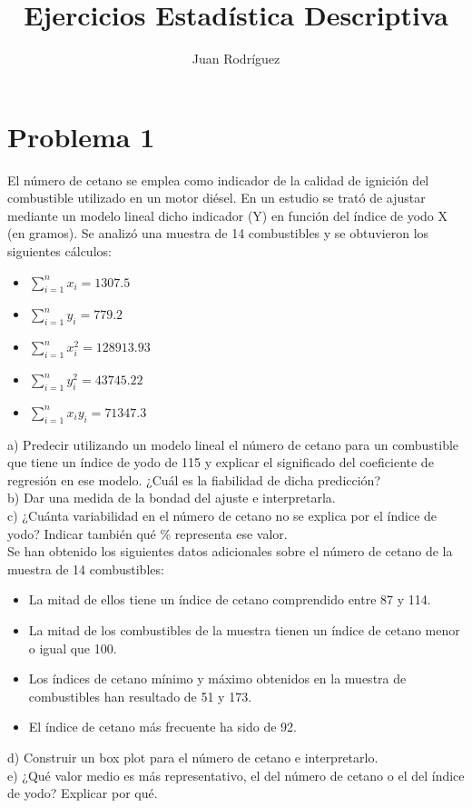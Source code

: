 \documentclass[fleqn]{article}
\title{Ejercicios Estadística Descriptiva}
\author{Juan Rodríguez}
\begin{document}
	\maketitle
	\section{Problema 1}
	El número de cetano se emplea como indicador de la calidad de ignición del combustible utilizado en un motor diésel. En un estudio se trató de ajustar mediante un modelo lineal dicho indicador (Y) en función del índice de yodo X (en gramos). Se analizó una muestra de 14 combustibles y se obtuvieron los siguientes cálculos:
	\begin{itemize}
		\item $\sum_{i=1}^n x_i = 1307.5$ 
		\item $\sum_{i=1}^n y_i = 779.2$ 
		\item $\sum_{i=1}^n x_i^2 = 128913.93$
		\item $\sum_{i=1}^n y_i^2 = 43745.22$
		\item $\sum_{i=1}^n x_i y_i = 71347.3$
	\end{itemize}
	a) Predecir utilizando un modelo lineal el número de cetano para un combustible que tiene un índice de yodo de 115 y explicar el significado del coeficiente de regresión en ese modelo. ¿Cuál es la fiabilidad de dicha predicción? \\
	b) Dar una medida de la bondad del ajuste e interpretarla. \\
	c) ¿Cuánta variabilidad en el número de cetano no se explica por el índice de yodo? Indicar también qué \% representa ese valor. \\
	
	Se han obtenido los siguientes datos adicionales sobre el número de cetano de la muestra de 14 combustibles:
	
	\begin{itemize}
		\item La mitad de ellos tiene un índice de cetano comprendido entre 87 y 114.
		\item La mitad de los combustibles de la muestra tienen un índice de cetano menor o igual que 100.
		\item Los índices de cetano mínimo y máximo obtenidos en la muestra de combustibles han resultado de 51 y 173.
		\item El índice de cetano más frecuente ha sido de 92.
	\end{itemize}
	d) Construir un box plot para el número de cetano e interpretarlo. \\
	e) ¿Qué valor medio es más representativo, el del número de cetano o el del índice de yodo? Explicar por qué.
\end{document}

